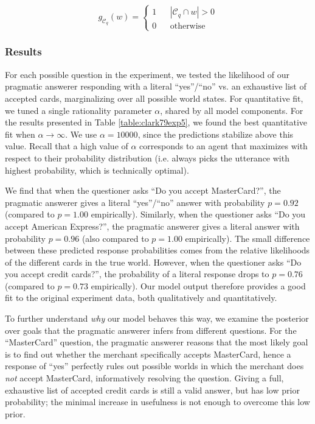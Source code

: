 \documentclass[12pt, floatsintext, jou]{apa6}
\begin{document}
$$g_{\mathcal{C}_q}(w) = \left\{\begin{array}{rcl} 1 && | \mathcal{C}_q \cap w | > 0 \\ 0 && \textrm{otherwise}\end{array}\right.$$

\subsubsection{Results}

For each possible question in the experiment, we tested the likelihood of our pragmatic answerer responding with a literal ``yes''/``no'' vs. an exhaustive list of accepted cards, marginalizing over all possible world states. For quantitative fit, we tuned a single rationality parameter $\alpha$, shared by all model components. For the results presented in Table \ref{table:clark79exp5}, we found the best quantitative fit when $\alpha \rightarrow \infty$. We use $\alpha = 10000$, since the predictions stabilize above this value. Recall that a high value of $\alpha$ corresponds to an agent that maximizes with respect to their probability distribution (i.e. always picks the utterance with highest probability, which is technically optimal). 


We find that when the questioner asks ``Do you accept MasterCard?'', the pragmatic answerer gives a literal ``yes''/``no'' answer with probability $p = 0.92$ (compared to $p=1.00$ empirically). Similarly, when the questioner asks ``Do you accept American Express?'', the pragmatic answerer gives a literal answer with probability $p = 0.96$ (also compared to $p=1.00$ empirically). The small difference between these predicted response probabilities comes from the relative likelihoods of the different cards in the true world. However, when the questioner asks ``Do you accept credit cards?'', the probability of a literal response drops to $p = 0.76$ (compared to $p=0.73$ empirically). Our model output therefore provides a good fit to the original experiment data, both qualitatively and quantitatively.

To further understand \emph{why} our model behaves this way, we examine the posterior over goals that the pragmatic answerer infers from different questions.  For the ``MasterCard'' question, the pragmatic answerer reasons that the most likely goal is to find out whether the merchant specifically accepts MasterCard, hence a response of ``yes'' perfectly rules out possible worlds in which the merchant does \emph{not} accept MasterCard, informatively resolving the question. Giving a full, exhaustive list of accepted credit cards is still a valid answer, but has low prior probability; the minimal increase in usefulness is not enough to overcome this low prior. 
\end{document}
